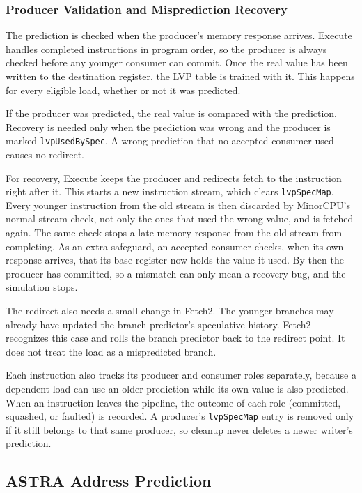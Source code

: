 \subsubsection{Producer Validation and Misprediction Recovery}

The prediction is checked when the producer's memory response
arrives. Execute handles completed instructions in program order, so
the producer is always checked before any younger consumer can
commit. Once the real value has been written to the destination
register, the LVP table is trained with it. This happens for every
eligible load, whether or not it was predicted.

If the producer was predicted, the real value is compared with the
prediction. Recovery is needed only when the prediction was wrong and
the producer is marked \texttt{lvpUsedBySpec}. A wrong prediction
that no accepted consumer used causes no redirect.

For recovery, Execute keeps the producer and redirects fetch to the
instruction right after it. This starts a new instruction stream,
which clears \texttt{lvpSpecMap}. Every younger instruction from the
old stream is then discarded by MinorCPU's normal stream check, not
only the ones that used the wrong value, and is fetched again. The
same check stops a late memory response from the old stream from
completing. As an extra safeguard, an accepted consumer checks, when
its own response arrives, that its base register now holds the value
it used. By then the producer has committed, so a mismatch can only
mean a recovery bug, and the simulation stops.

The redirect also needs a small change in Fetch2. The younger branches may already have updated the
branch predictor's speculative history. Fetch2 recognizes this case
and rolls the branch predictor back to the redirect point. It does
not treat the load as a mispredicted branch.

Each instruction also tracks its producer and consumer roles
separately, because a dependent load can use an older prediction
while its own value is also predicted. When an instruction leaves the
pipeline, the outcome of each role (committed, squashed, or faulted)
is recorded. A producer's \texttt{lvpSpecMap} entry is removed only
if it still belongs to that same producer, so cleanup never deletes a
newer writer's prediction.

\subsection{ASTRA Address Prediction}
\label{sec:impl-astra}

